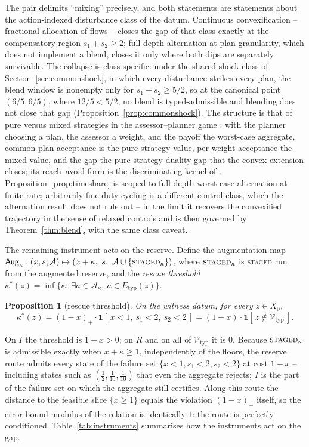 \documentclass[preprint,11pt,authoryear]{elsarticle}
\newtheorem{proposition}{Proposition}
\theoremstyle{definition}
\theoremstyle{remark}
\newcommand{\Etyp}{E_{\mathrm{typ}}}
\newcommand{\Vtyp}{\mathcal{V}_{\mathrm{typ}}}
\newcommand{\act}[1]{\textsc{#1}}
\begin{document}
The pair delimits ``mixing'' precisely, and both statements are statements about the action-indexed disturbance class of the datum. Continuous convexification -- fractional allocation of flows -- closes the gap of that class exactly at the compensatory region $s_1+s_2\ge2$; full-depth alternation at plan granularity, which does not implement a blend, closes it only where both dips are separately survivable. The collapse is class-specific: under the shared-shock class of Section~\ref{sec:commonshock}, in which every disturbance strikes every plan, the blend window is nonempty only for $s_1+s_2\ge5/2$, so at the canonical point $(6/5,6/5)$, where $12/5<5/2$, no blend is typed-admissible and blending does not close that gap (Proposition~\ref{prop:commonshock}). The structure is that of pure versus mixed strategies in the assessor--planner game \citep{vonNeumann1928,Sion1958}: with the planner choosing a plan, the assessor a weight, and the payoff the worst-case aggregate, common-plan acceptance is the pure-strategy value, per-weight acceptance the mixed value, and the gap the pure-strategy duality gap that the convex extension closes; its reach--avoid form is the discriminating kernel of \citet{Cardaliaguet1996}. Proposition~\ref{prop:timeshare} is scoped to full-depth worst-case alternation at finite rate; arbitrarily fine duty cycling is a different control class, which the alternation result does not rule out -- in the limit it recovers the convexified trajectory in the sense of relaxed controls \citep{Filippov1988,Warga1972} and is then governed by Theorem~\ref{thm:blend}, with the same class caveat.

The remaining instrument acts on the reserve. Define the augmentation map $\mathsf{Aug}_\kappa:(x,s,\mathcal A)\mapsto(x+\kappa,\ s,\ \mathcal A\cup\{\act{staged}_\kappa\})$, where $\act{staged}_\kappa$ is \act{staged} run from the augmented reserve, and the \emph{rescue threshold} $\kappa^*(z)=\inf\{\kappa:\ \exists a\in\mathcal A_\kappa,\ a\in\Etyp(z)\}$.

\begin{proposition}[rescue threshold]\label{prop:rescue}
On the witness datum, for every $z\in X_0$,
\[
\kappa^*(z)=(1-x)_+\cdot\mathbf 1[\,x<1,\ s_1<2,\ s_2<2\,]=(1-x)\cdot\mathbf 1[\,z\notin\Vtyp\,].
\]
\end{proposition}

On $I$ the threshold is $1-x>0$; on $R$ and on all of $\Vtyp$ it is $0$. Because $\act{staged}_\kappa$ is admissible exactly when $x+\kappa\ge1$, independently of the floors, the reserve route admits every state of the failure set $\{x<1,s_1<2,s_2<2\}$ at cost $1-x$ -- including states such as $(\tfrac12,\tfrac1{10},\tfrac1{10})$ that even the aggregate rejects; $I$ is the part of the failure set on which the aggregate still certifies. Along this route the distance to the feasible slice $\{x\ge1\}$ equals the violation $(1-x)_+$ itself, so the error-bound modulus \citep{Fabian2010} of the relation is identically $1$: the route is perfectly conditioned. Table~\ref{tab:instruments} summarises how the instruments act on the gap.
\end{document}
